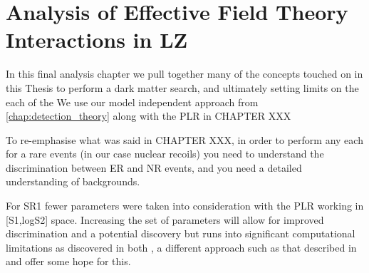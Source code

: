 \chapter{Analysis of Effective Field Theory Interactions in LZ}
\label{chap:eft_work}
In this final analysis chapter we pull together many of the concepts touched on in this Thesis to perform a dark matter search, and ultimately setting limits on the each of the 
We use our model independent approach from \autoref{chap:detection_theory} along with the PLR in CHAPTER XXX

\par
To re-emphasise what was said in CHAPTER XXX, in order to perform any each for a rare events (in our case nuclear recoils) you need to understand the discrimination between ER and NR events, and you need a detailed understanding of backgrounds.




%

%

%



%

%

For SR1 fewer parameters were taken into consideration with the PLR working in [S1,logS2] space.
Increasing the set of parameters will allow for improved discrimination and a potential discovery but runs into significant computational limitations as discovered in both \cite{nicolelarsen_thesis_ref, shaunalsum_thesis_ref, billyboxer_thesis_ref}, a different approach such as that described in \cite{flamenest_ref} and \cite{lux_ml_plr_ref} offer some hope for this.